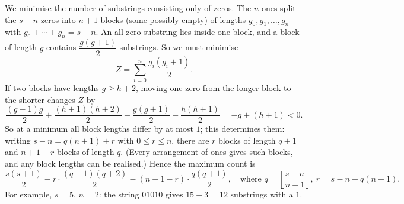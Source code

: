 We minimise the number of substrings consisting only of zeros. The $n$ ones split the $s-n$ zeros into $n+1$ blocks (some possibly empty) of lengths $g_0,g_1,\dots,g_n$ with $g_0+\cdots+g_n=s-n$. An all-zero substring lies inside one block, and a block of length $g$ contains $\dfrac{g(g+1)}{2}$ substrings. So we must minimise
\[Z=\sum_{i=0}^{n}\dfrac{g_i(g_i+1)}{2}.\]
If two blocks have lengths $g\ge h+2$, moving one zero from the longer block to the shorter changes $Z$ by
\[\dfrac{(g-1)g}{2}+\dfrac{(h+1)(h+2)}{2}-\dfrac{g(g+1)}{2}-\dfrac{h(h+1)}{2}=-g+(h+1)<0.\]
So at a minimum all block lengths differ by at most $1$; this determines them: writing $s-n=q(n+1)+r$ with $0\le r\le n$, there are $r$ blocks of length $q+1$ and $n+1-r$ blocks of length $q$. (Every arrangement of ones gives such blocks, and any block lengths can be realised.) Hence the maximum count is
\[\boxed{\dfrac{s(s+1)}{2}-r\cdot\dfrac{(q+1)(q+2)}{2}-(n+1-r)\cdot\dfrac{q(q+1)}{2}},\quad\text{where } q=\left\lfloor\dfrac{s-n}{n+1}\right\rfloor,\ r=s-n-q(n+1).\]
For example, $s=5$, $n=2$: the string $01010$ gives $15-3=12$ substrings with a $1$.
